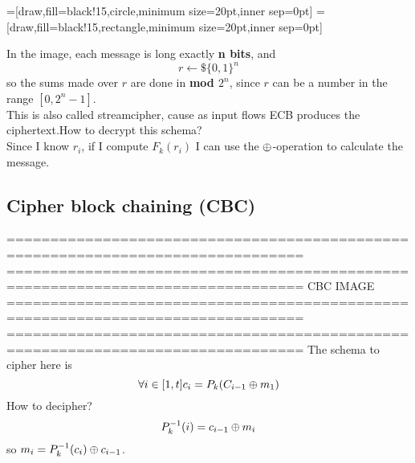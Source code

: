 \begin{preview}
=[draw,fill=black!15,circle,minimum size=20pt,inner sep=0pt]
=[draw,fill=black!15,rectangle,minimum size=20pt,inner sep=0pt]
\centering
{}
\end{preview}

In the image, each message is long exactly \textbf{n bits}, and 
\[
r \leftarrow\$ \{0,1\}^{n} 
\]
so the sums made over $r$ are done in \textbf{mod $2^{n}$}, since $r$ can be a
number in the range $[0, 2^{n} -1]$.\\

This is also called streamcipher, cause as input flows ECB produces the
ciphertext.How to decrypt this schema?\\
Since I know $r_{i}$, if I compute $F_{k}(r_{i})$ I can use the $\oplus$-operation
to calculate the message.\\

\subsection{Cipher block chaining (CBC)}
================================================================================
================================================================================
                    CBC IMAGE
================================================================================
================================================================================
The schema to cipher here is 
\[ 
    \forall i \in [1,t] c_{i}=P_{k}(C_{i-1}\oplus m_{1})
\]
How to decipher?
\[
    P_{k}^{-1}(i)= c_{i-1} \oplus m_{i}
\]
so $m_{i}= P_{k}^{-1}(c_{i}) \oplus c_{i-1}$.\\

